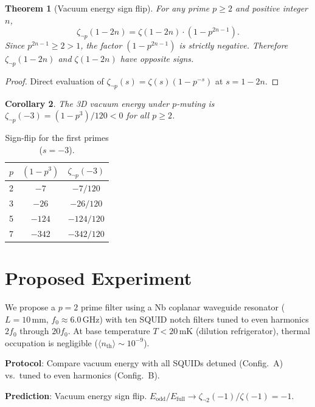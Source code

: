 \documentclass[11pt,a4paper]{article}
\newtheorem{theorem}{Theorem}[section]
\newtheorem{corollary}[theorem]{Corollary}
\begin{document}
\begin{theorem}[Vacuum energy sign flip]
\label{thm:sign_flip}
For any prime $p \geq 2$ and positive integer $n$,
\begin{equation}
  \zeta_{\neg p}(1-2n) = \zeta(1-2n)\cdot(1 - p^{2n-1}).
\end{equation}
Since $p^{2n-1} \geq 2 > 1$, the factor $(1-p^{2n-1})$ is strictly
negative. Therefore $\zeta_{\neg p}(1-2n)$ and $\zeta(1-2n)$ have
opposite signs.
\end{theorem}

\begin{proof}
Direct evaluation of $\zeta_{\neg p}(s) = \zeta(s)(1-p^{-s})$ at $s = 1-2n$.
\end{proof}

\begin{corollary}
The 3D vacuum energy under $p$-muting is
$\zeta_{\neg p}(-3) = (1-p^3)/120 < 0$ for all $p \geq 2$.
\end{corollary}

\begin{table}[h]
\centering
\caption{Sign-flip for the first primes ($s=-3$).}
\begin{tabular}{@{}ccc@{}}
\toprule
$p$ & $(1-p^3)$ & $\zeta_{\neg p}(-3)$ \\
\midrule
2 & $-7$ & $-7/120$ \\
3 & $-26$ & $-26/120$ \\
5 & $-124$ & $-124/120$ \\
7 & $-342$ & $-342/120$ \\
\bottomrule
\end{tabular}
\end{table}

\section{Proposed Experiment}

We propose a $p=2$ prime filter using a Nb coplanar waveguide
resonator ($L = 10\,$mm, $f_0 \approx 6.0\,$GHz) with ten SQUID
notch filters tuned to even harmonics $2f_0$ through $20f_0$.
At base temperature $T < 20\,$mK (dilution refrigerator),
thermal occupation is negligible ($\langle n_{\mathrm{th}}\rangle \sim 10^{-9}$).

\textbf{Protocol}: Compare vacuum energy with all SQUIDs detuned (Config.~A)
vs.\ tuned to even harmonics (Config.~B).

\textbf{Prediction}: Vacuum energy sign flip.
$E_{\mathrm{odd}}/E_{\mathrm{full}} \to \zeta_{\neg 2}(-1)/\zeta(-1) = -1$.
\end{document}
